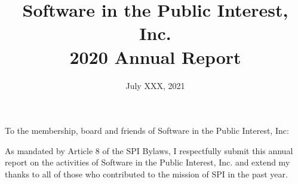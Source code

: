 \documentclass[a4paper]{report}
\begin{document}
\title{Software in the Public Interest, Inc.\\
2020 Annual Report}
\date{July XXX, 2021}

\maketitle

\newpage


\hspace{1em}

To the membership, board and friends of Software in the Public Interest, Inc:

As mandated by Article 8 of the SPI Bylaws, I respectfully submit this annual report on the activities of Software in the Public Interest, Inc. and extend my thanks to all of those who contributed to the mission of SPI in the past year.
\end{document}
